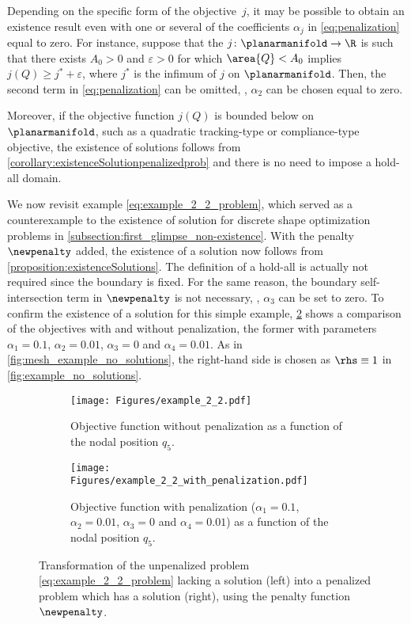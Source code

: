 \begin{remark}
	Depending on the specific form of the objective~$j$, it may be possible to obtain an existence result even with one or several of the coefficients $\alpha_j$ in \eqref{eq:penalization} equal to zero.
	For instance, suppose that the $j \colon \planarmanifold \to \R$ is such that there exists $A_0 > 0$ and $\varepsilon > 0$ for which $\area{Q} < A_0$ implies $j(Q) \ge j^* + \varepsilon$, where $j^*$ is the infimum of $j$ on $\planarmanifold$.
	Then, the second term in \eqref{eq:penalization} can be omitted, \ie, $\alpha_2$ can be chosen equal to zero.

	Moreover, if the objective function $j(Q)$ is  bounded below on $\planarmanifold$, such as a quadratic tracking-type or compliance-type objective, the existence of solutions follows from \cref{corollary:existenceSolutionpenalizedprob} and there is no need to impose a hold-all domain.
\end{remark}

We now revisit example \eqref{eq:example_2_2_problem}, which served as a counterexample to the existence of solution for discrete shape optimization problems in \cref{subsection:first_glimpse_non-existence}.
With the penalty~$\newpenalty$ added, the existence of a solution now follows from \cref{proposition:existenceSolutions}.
The definition of a hold-all is actually not required since the boundary is fixed.
For the same reason, the boundary self-intersection term in $\newpenalty$ is not necessary, \ie, $\alpha_3$ can be set to zero.
To confirm the existence of a solution for this simple example, \cref{fig:example_2_2_penalized} shows a comparison of the objectives with and without penalization, the former with parameters $\alpha_1 = 0.1$, $\alpha_2 = 0.01$, $\alpha_3 = 0$ and $\alpha_4 = 0.01$.
As in \cref{fig:mesh_example_no_solutions}, the right-hand side is chosen as $\rhs \equiv 1$ in \eqref{fig:example_no_solutions}.

\begin{figure}[htp]
	\begin{center}
		\begin{subfigure}[t]{0.45\textwidth}
			\centering
			\texttt{[image: Figures/example\_2\_2.pdf]}
			\caption{Objective function without penalization as a function of the nodal position $q_5$.}
		\end{subfigure}
		\hfill
		\begin{subfigure}[t]{0.45\textwidth}
			\centering
			\texttt{[image: Figures/example\_2\_2\_with\_penalization.pdf]}
			\caption{Objective function with penalization ($\alpha_1 = 0.1$, $\alpha_2 = 0.01$, $\alpha_3 = 0$ and $\alpha_4 = 0.01$) as a function of the nodal position $q_5$.}
			\label{fig:example_2_2_penalized}
		\end{subfigure}
		\caption{Transformation of the unpenalized problem \eqref{eq:example_2_2_problem} lacking a solution (left) into a penalized problem which has a solution (right), using the penalty function~$\newpenalty$.}
	\end{center}
\end{figure}


